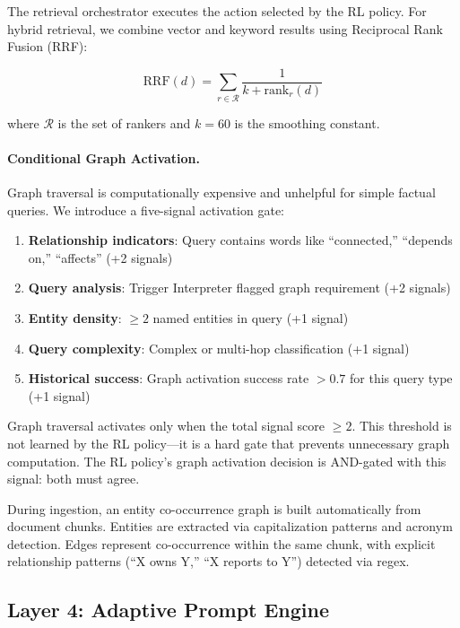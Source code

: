 \documentclass[11pt]{article}
\begin{document}
The retrieval orchestrator executes the action selected by the RL policy. For hybrid retrieval, we combine vector and keyword results using Reciprocal Rank Fusion (RRF):

\begin{equation}
    \text{RRF}(d) = \sum_{r \in \mathcal{R}} \frac{1}{k + \text{rank}_r(d)}
\end{equation}

where $\mathcal{R}$ is the set of rankers and $k=60$ is the smoothing constant.

\paragraph{Conditional Graph Activation.} Graph traversal is computationally expensive and unhelpful for simple factual queries. We introduce a five-signal activation gate:

\begin{enumerate}
    \item \textbf{Relationship indicators}: Query contains words like ``connected,'' ``depends on,'' ``affects'' (+2 signals)
    \item \textbf{Query analysis}: Trigger Interpreter flagged graph requirement (+2 signals)
    \item \textbf{Entity density}: $\geq 2$ named entities in query (+1 signal)
    \item \textbf{Query complexity}: Complex or multi-hop classification (+1 signal)
    \item \textbf{Historical success}: Graph activation success rate $> 0.7$ for this query type (+1 signal)
\end{enumerate}

Graph traversal activates only when the total signal score $\geq 2$. This threshold is not learned by the RL policy---it is a hard gate that prevents unnecessary graph computation. The RL policy's graph activation decision is AND-gated with this signal: both must agree.

During ingestion, an entity co-occurrence graph is built automatically from document chunks. Entities are extracted via capitalization patterns and acronym detection. Edges represent co-occurrence within the same chunk, with explicit relationship patterns (``X owns Y,'' ``X reports to Y'') detected via regex.

\subsection{Layer 4: Adaptive Prompt Engine}
\end{document}
